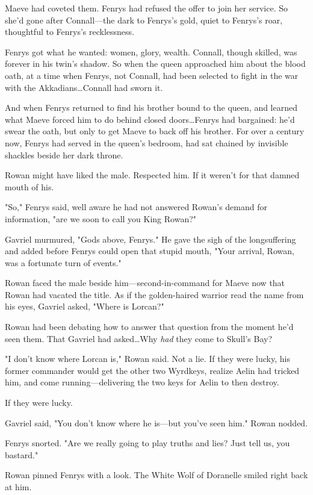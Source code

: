 Maeve had coveted them.
Fenrys had refused the offer to join her service.
So she'd gone after Connall---the dark to Fenrys's gold, quiet to Fenrys's roar, thoughtful to Fenrys's recklessness.

Fenrys got what he wanted: women, glory, wealth.
Connall, though skilled, was forever in his twin's shadow.
So when the queen approached him about the blood oath, at a time when Fenrys, not Connall, had been selected to fight in the war with the Akkadians\ldots Connall had sworn it.

And when Fenrys returned to find his brother bound to the queen, and learned what Maeve forced him to do behind closed doors\ldots Fenrys had bargained: he'd swear the oath, but only to get Maeve to back off his brother.
For over a century now, Fenrys had served in the queen's bedroom, had sat chained by invisible shackles beside her dark throne.

Rowan might have liked the male.
Respected him.
If it weren't for that damned mouth of his.

"So," Fenrys said, well aware he had not answered Rowan's demand for information, "are we soon to call you King Rowan?"

Gavriel murmured, "Gods above, Fenrys."
He gave the sigh of the longsuffering and added before Fenrys could open that stupid mouth, "Your arrival, Rowan, was a fortunate turn of events."

Rowan faced the male beside him---second-in-command for Maeve now that Rowan had vacated the title.
As if the golden-haired warrior read the name from his eyes, Gavriel asked, "Where is Lorcan?"

Rowan had been debating how to answer that question from the moment he'd seen them.
That Gavriel had asked\ldots Why \emph{had} they come to Skull's Bay?

"I don't know where Lorcan is," Rowan said.
Not a lie.
If they were lucky, his former commander would get the other two Wyrdkeys, realize Aelin had tricked him, and come running---delivering the two keys for Aelin to then destroy.

If they were lucky.

Gavriel said, "You don't know where he is---but you've seen him."
Rowan nodded.

Fenrys snorted.
"Are we really going to play truths and lies?
Just tell us, you bastard."

Rowan pinned Fenrys with a look.
The White Wolf of Doranelle smiled right back at him.

